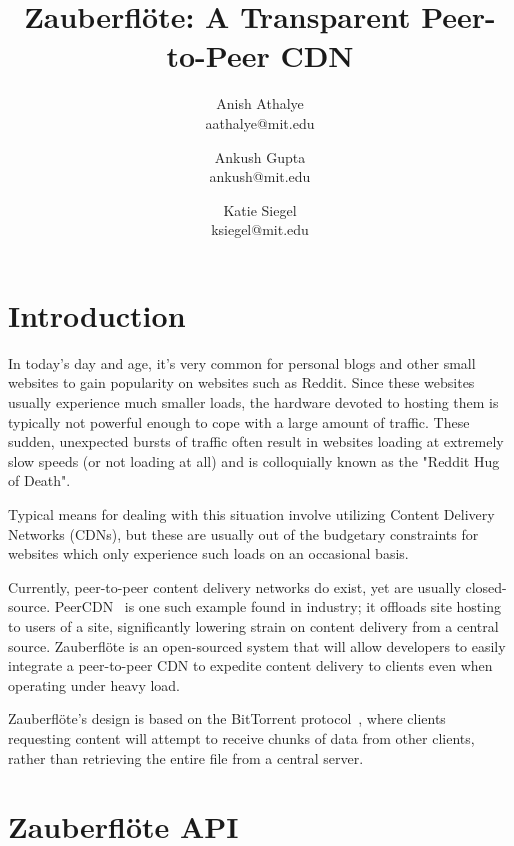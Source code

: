 \documentclass[letterpaper,twocolumn,10pt]{article}
\newcommand{\zbf}{Zauberfl\"{o}te\xspace}
\newcommand{\projtitle}{\zbf: A Transparent Peer-to-Peer CDN}
\begin{document}
\title{\Large \bf \projtitle}

\author{
    {\rm Anish Athalye}\\
    aathalye@mit.edu
    \and
    {\rm Ankush Gupta}\\
    ankush@mit.edu
    \and
    {\rm Katie Siegel}\\
    ksiegel@mit.edu
}

\maketitle
\thispagestyle{empty}

\begin{abstract}
\end{abstract}

\section{Introduction}
In today's day and age, it's very common for personal blogs and other small websites to gain popularity on websites such as Reddit. Since these websites usually experience much smaller loads, the hardware devoted to hosting them is typically not powerful enough to cope with a large amount of traffic. These sudden, unexpected bursts of traffic often result in websites loading at extremely slow speeds (or not loading at all) and is colloquially known as the "Reddit Hug of Death".

Typical means for dealing with this situation involve utilizing Content Delivery Networks (CDNs), but these are usually out of the budgetary constraints for websites which only experience such loads on an occasional basis.

Currently, peer-to-peer content delivery networks do exist, yet are usually
closed-source. PeerCDN~\cite{peercdn} is one such example found in
industry; it offloads site hosting to users of a site, significantly lowering strain on content delivery from a central source. \zbf is an open-sourced system
that will allow developers to easily integrate a peer-to-peer CDN to expedite
content delivery to clients even when operating under heavy load.

\zbf's design is based on the BitTorrent protocol~\cite{cohen:bittorrent}, where
clients requesting content will attempt to receive chunks of data from other
clients, rather than retrieving the entire file from a central server.

\section{\zbf API}
\end{document}
